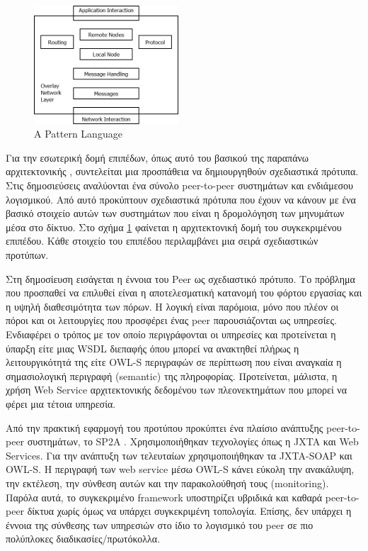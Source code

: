 \begin{figure}
  \begin{center}
    \includegraphics[width=0.48\textwidth]{Figures/Related_work/A_pattern_language.png}
  \end{center}
  \caption{A Pattern Language}
  \label{fig:Patterns}
\end{figure}

Για την εσωτερική δομή επιπέδων, όπως αυτό του βασικού της παραπάνω 
αρχιτεκτονικής , συντελείται μια προσπάθεια να δημιουργηθούν σχεδιαστικά 
πρότυπα. Στις δημοσιεύσεις \citep{Grolimund2005, Grolimund2006} αναλύονται 
ένα σύνολο peer-to-peer συστημάτων και ενδιάμεσου λογισμικού. Από αυτό 
προκύπτουν σχεδιαστικά πρότυπα που έχουν να κάνουν με ένα βασικό στοιχείο 
αυτών των συστημάτων που είναι η δρομολόγηση των μηνυμάτων μέσα στο δίκτυο. 
Στο σχήμα \ref{fig:Patterns} φαίνεται η αρχιτεκτονική δομή του συγκεκριμένου επιπέδου. 
Κάθε στοιχείο του επιπέδου περιλαμβάνει μια σειρά σχεδιαστικών προτύπων. 

Στη δημοσίευση \citep{Amoretti2005} εισάγεται η έννοια 
του Peer ως σχεδιαστικό πρότυπο. Το πρόβλημα που προσπαθεί να επιλυθεί 
είναι η αποτελεσματική κατανομή του φόρτου εργασίας και η υψηλή 
διαθεσιμότητα των πόρων. Η λογική είναι παρόμοια, μόνο που πλέον οι πόροι 
και οι λειτουργίες που προσφέρει ένας peer παρουσιάζονται ως υπηρεσίες. 
Ενδιαφέρει ο τρόπος με τον οποίο περιγράφονται οι υπηρεσίες και 
προτείνεται η ύπαρξη είτε μιας WSDL διεπαφής όπου μπορεί να ανακτηθεί 
πλήρως η λειτουργικότητά της είτε OWL-S περιγραφών σε περίπτωση που 
είναι αναγκαία η σημασιολογική περιγραφή (semantic) της πληροφορίας. 
Προτείνεται, μάλιστα, η χρήση Web Service αρχιτεκτονικής δεδομένου των 
πλεονεκτημάτων που μπορεί να φέρει μια τέτοια υπηρεσία. 

Από την πρακτική εφαρμογή του προτύπου προκύπτει ένα πλαίσιο ανάπτυξης 
peer-to-peer συστημάτων, το SP2A \citep{Amoretti2005SP2A}. 
Χρησιμοποιήθηκαν τεχνολογίες όπως η JXTA και Web Services. Για την ανάπτυξη 
των τελευταίων χρησιμοποιήθηκαν τα JXTA-SOAP και OWL-S. Η περιγραφή των web 
service μέσω OWL-S κάνει εύκολη την ανακάλυψη, την εκτέλεση, την σύνθεση 
αυτών και την παρακολούθησή τους (monitoring). Παρόλα αυτά, το συγκεκριμένο 
framework υποστηρίζει υβριδικά και καθαρά peer-to-peer δίκτυα χωρίς όμως να 
υπάρχει συγκεκριμένη τοπολογία. Επίσης, δεν υπάρχει η έννοια της 
σύνθεσης των υπηρεσιών στο ίδιο το λογισμικό του peer σε πιο πολύπλοκες 
διαδικασίες/πρωτόκολλα.

